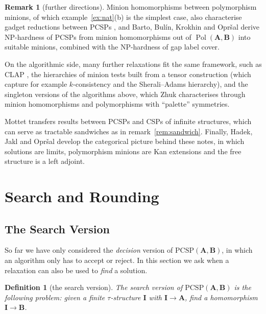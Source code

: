 \documentclass[11pt]{article}
\theoremstyle{plain}
\newtheorem{definition}[theorem]{Definition}
\theoremstyle{definition}
\newtheorem{remark}[theorem]{Remark}
\newcommand{\Pol}{\operatorname{Pol}}
\newcommand{\bA}{\mathbf{A}}
\newcommand{\bB}{\mathbf{B}}
\newcommand{\bI}{\mathbf{I}}
\newcommand{\PCSP}{\mathrm{PCSP}}
\begin{document}
\begin{remark}[further directions]\label{rem:further}
Minion homomorphisms between polymorphism minions, of which example~\ref{ex:nat}(b) is the simplest case, also characterise gadget reductions between PCSPs \cite{BBKO,KO}, and Barto, Bulín, Krokhin and Opršal \cite{BBKO} derive NP-hardness of PCSPs from minion homomorphisms out of $\Pol(\bA,\bB)$ into suitable minions, combined with the NP-hardness of gap label cover.

On the algorithmic side, many further relaxations fit the same framework, such as CLAP \cite{CZ-CLAP}, the hierarchies of minion tests built from a tensor construction \cite{CZ-tensors} (which capture for example $k$-consistency and the Sherali--Adams hierarchy), and the singleton versions of the algorithms above, which Zhuk \cite{Zhuk} characterises through minion homomorphisms and polymorphisms with ``palette'' symmetries.

Mottet \cite{Mottet} transfers results between PCSPs and CSPs of infinite structures, which can serve as tractable sandwiches as in remark~\ref{rem:sandwich}. Finally, Hadek, Jakl and Opršal \cite{HJO} develop the categorical picture behind these notes, in which solutions are limits, polymorphism minions are Kan extensions and the free structure is a left adjoint.
\end{remark}

\section{Search and Rounding}\label{sec:search-round}

\subsection{The Search Version}\label{sec:search}

So far we have only considered the \emph{decision} version of $\PCSP(\bA,\bB)$, in which an algorithm only has to accept or reject. In this section we ask when a relaxation can also be used to \emph{find} a solution.

\begin{definition}[the search version]
The \emph{search version} of $\PCSP(\bA,\bB)$ is the following problem: given a finite $\tau$-structure $\bI$ with $\bI\to\bA$, find a homomorphism $\bI\to\bB$.
\end{definition}
\end{document}
